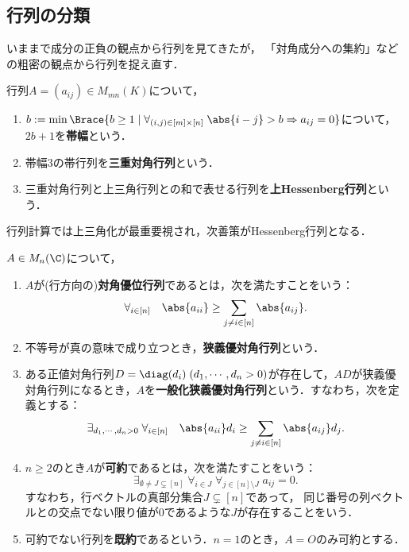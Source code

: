 \documentclass[uplatex, dvipdfmx]{jsreport}
\begin{document}
\subsection{行列の分類}

\begin{tcolorbox}[colframe=ForestGreen, colback=ForestGreen!10!white,breakable,colbacktitle=ForestGreen!40!white,coltitle=black,fonttitle=\bfseries\sffamily,
title=]
    いままで成分の正負の観点から行列を見てきたが，
    「対角成分への集約」などの粗密の観点から行列を捉え直す．
\end{tcolorbox}

\begin{definition}
    行列$A=(a_{ij})\in M_{mn}(K)$について，
    \begin{enumerate}
        \item $b:=\min\Brace{b\ge1\mid\forall_{(i,j)\in[m]\times[n]}\;\abs{i-j}>b\Rightarrow a_{ij}=0}$について，$2b+1$を\textbf{帯幅}という．
        \item 帯幅3の帯行列を\textbf{三重対角行列}という．
        \item 三重対角行列と上三角行列との和で表せる行列を\textbf{上Hessenberg行列}という．
    \end{enumerate}
\end{definition}
\begin{remarks}
    行列計算では上三角化が最重要視され，次善策がHessenberg行列となる．
\end{remarks}

\begin{definition}
    $A\in M_n(\C)$について，
    \begin{enumerate}
        \item $A$が(行方向の)\textbf{対角優位行列}であるとは，次を満たすことをいう：
        \[\forall_{i\in[n]}\quad\abs{a_{ii}}\ge\sum_{j\ne i\in[n]}\abs{a_{ij}}.\]
        \item 不等号が真の意味で成り立つとき，\textbf{狭義優対角行列}という．
        \item ある正値対角行列$D=\diag(d_i)\;(d_1,\cdots,d_n>0)$が存在して，$AD$が狭義優対角行列になるとき，$A$を\textbf{一般化狭義優対角行列}という．すなわち，次を定義とする：
        \[\exists_{d_1,\cdots,d_n>0}\;\forall_{i\in[n]}\quad\abs{a_{ii}}d_i\ge\sum_{j\ne i\in[n]}\abs{a_{ij}}d_j.\]
        \item $n\ge2$のとき$A$が\textbf{可約}であるとは，次を満たすことをいう：
        \[\exists_{\emptyset\ne J\subsetneq[n]}\;\forall_{i\in J}\;\forall_{j\in[n]\setminus J}\;a_{ij}=0.\]
        すなわち，行ベクトルの真部分集合$J\subsetneq [n]$であって，
        同じ番号の列ベクトルとの交点でない限り値が$0$であるような$J$が存在することをいう．
        \item 可約でない行列を\textbf{既約}であるという．$n=1$のとき，$A=O$のみ可約とする．
    \end{enumerate}
\end{definition}
\end{document}

